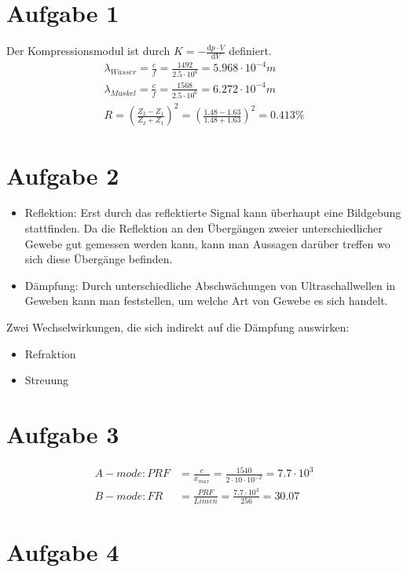 \section{Aufgabe 1}
Der Kompressionsmodul ist durch $K = -\frac{\mathrm{d}p \cdot V}{\mathrm{d}V} $ definiert. 
\begin{align*}
    \lambda_{Wasser} = \frac{c}{f} = \frac{1492}{2.5 \cdot 10^6} = 5.968 \cdot 10^{-4} m \\
    \lambda_{Muskel} = \frac{c}{f} = \frac{1568}{2.5 \cdot 10^6} = 6.272 \cdot 10^{-4} m \\
    R = (\frac{Z_2 - Z_1}{Z_2 + Z_1})^2 = (\frac{1.48 - 1.63}{1.48 + 1.63})^2 = 0.413\%
\end{align*}


\section{Aufgabe 2}
\begin{itemize}
    \item Reflektion:
    Erst durch das reflektierte Signal kann überhaupt eine Bildgebung stattfinden. Da die Reflektion an den Übergängen zweier unterschiedlicher Gewebe gut gemessen werden kann, kann man Aussagen darüber treffen wo sich diese Übergänge befinden. 
    \item Dämpfung: Durch unterschiedliche Abschwächungen von Ultraschallwellen in Geweben kann man feststellen, um welche Art von Gewebe es sich handelt.
\end{itemize}

Zwei Wechselwirkungen, die sich indirekt auf die Dämpfung auswirken:
\begin{itemize}
    \item Refraktion
    \item Streuung
\end{itemize}


\section{Aufgabe 3}
\begin{align*}
    A-mode: PRF &= \frac{c}{x_{max}} = \frac{1540}{2 \cdot 10 \cdot 10^{-2}} = 7.7 \cdot 10^3 \\
    B-mode: FR &= \frac{PRF}{Linien} = \frac{7.7 \cdot 10^3}{256} = 30.07
\end{align*}

\section{Aufgabe 4}


